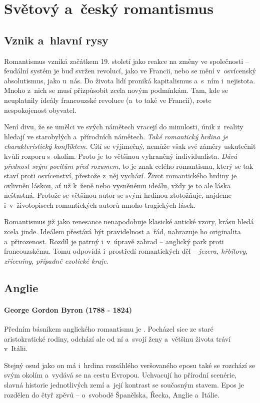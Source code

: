 \chapter{Světový a~český romantismus}
\section{Vznik a~hlavní rysy}
Romantismus vzniká začátkem 19. století jako reakce na změny ve
společnosti -- feudální systém je buď svržen revolucí, jako ve Francii,
nebo se mění v~osvícenský absolutismus, jako u~nás. Do života lidí
proniká kapitalismus a~s~ním i~nejistota. Mnoho z~nich se musí
přizpůsobit zcela novým podmínkám. Tam, kde se neuplatnily ideály
francouzské revoluce (a~to také ve Francii), roste nespokojenost
obyvatel.

Není divu, že se umělci ve svých námětech vracejí do minulosti, únik
z~reality hledají ve starobylých a~přírodních námětech. \emph{Také
romantický hrdina je charakteristický konfliktem.} Cítí se výjimečný,
nemůže však své záměry uskutečnit kvůli rozporu s~okolím. Proto je to
většinou vyhraněný individualista. \emph{Dává přednost svým pocitům před
rozumem},  to je znak celého romantismu, který se tak staví proti
osvícenství, přestože z~něj vychází. Život romantického hrdiny je
ovlivněn láskou, ať už k~ženě nebo vysněnému ideálu, vždy je to ale
láska nešťastná. Protože se většinou autor se svým hrdinou ztotožňuje,
najdeme i~v~životopisech romantických autorů mnoho tragických lásek.

Romantismus již jako renesance nenapodobuje klasické antické vzory,
krásu hledá zcela jinde. Ideálem přestává být pravidelnost a~řád,
nahrazuje ho originalita a~přirozenost. Rozdíl je patrný i~v~úpravě
zahrad -- anglický park proti francouzskému. Tomu odpovídá i~prostředí
romantických děl -- \emph{jezera, hřbitovy, zříceniny, případně exotické kraje}.

\section{Anglie}
\subsubsection*{George Gordon Byron (1788 - 1824)}
Předním básníkem anglického romantismu je .
Pocházel sice ze staré aristokratické rodiny, odchází ale od ní a~svojí
ženy a~většinu života tráví v~Itálii.

Stejný osud jako on má i~hrdina rozsáhlého veršovaného eposu 
 také se rozchází se svým okolím a~vydává
se na cestu Evropou. Uchvacují ho přírodní scenérie, slavná historie
jednotlivých zemí a~její kontrast se současným stavem. Epos je rozdělen
do čtyř zpěvů -- o~svobodě Španělska, Řecka, Anglie a~Itálie.

